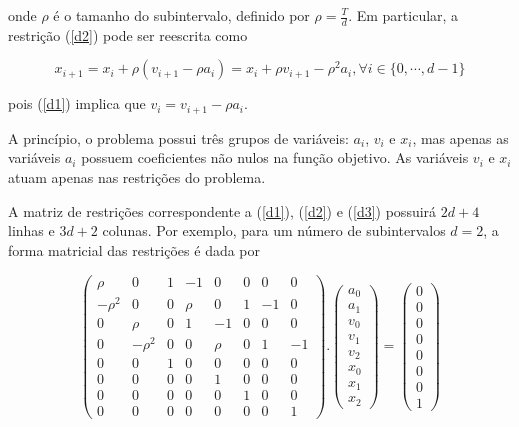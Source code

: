 \documentclass[10pt,oneside,a4paper]{article}
\begin{document}
\noindent
onde $\rho$ é o tamanho do subintervalo, definido por $\rho = \frac{T}{d}$. Em particular, a restrição (\ref{d2}) pode ser reescrita como

\[ 
x_{i+1} = x_i + \rho (v_{i+1} - \rho a_i) = x_i + \rho v_{i+1} - \rho^2 a_i, \forall i \in \{0, \dotsm, d-1\}
\]

\noindent
pois (\ref{d1}) implica que $ v_i = v_{i+1} - \rho a_i $.

A princípio, o problema possui três grupos de variáveis: $ a_i $, $ v_i $ e $ x_i $, mas apenas as variáveis $ a_i $ possuem coeficientes não nulos na função objetivo. As variáveis $ v_i $ e $ x_i $ atuam apenas nas restrições do problema.

A matriz de restrições correspondente a (\ref{d1}), (\ref{d2}) e (\ref{d3}) possuirá $ 2d+4 $ linhas e $ 3d+2 $ colunas. Por exemplo, para um número de subintervalos $ d=2 $, a forma matricial das restrições é dada por

\begin{equation}
\begin{pmatrix}
\rho & 0 & 1 & -1 & 0 & 0 & 0  & 0 \\
-\rho^2 & 0 & 0 & \rho & 0 & 1 & -1 & 0 \\
0 & \rho & 0 & 1 & -1 & 0 & 0 & 0  \\
0 & -\rho^2 & 0 & 0 & \rho & 0 & 1 & -1 \\
0 & 0 & 1 & 0 & 0 & 0 & 0 & 0 \\
0 & 0 & 0 & 0 & 1 & 0 & 0 & 0 \\
0 & 0 & 0 & 0 & 0 & 1 & 0 & 0 \\
0 & 0 & 0 & 0 & 0 & 0 & 0 & 1
\end{pmatrix}
.
\begin{pmatrix}
a_0 \\
a_1 \\
v_0 \\
v_1 \\
v_2 \\
x_0 \\
x_1 \\
x_2 
\end{pmatrix}
=
\begin{pmatrix}
0 \\ 0 \\ 0 \\ 0 \\ 0 \\ 0 \\ 0 \\ 1
\end{pmatrix}
\label{matricial}
\end{equation}
\end{document}
